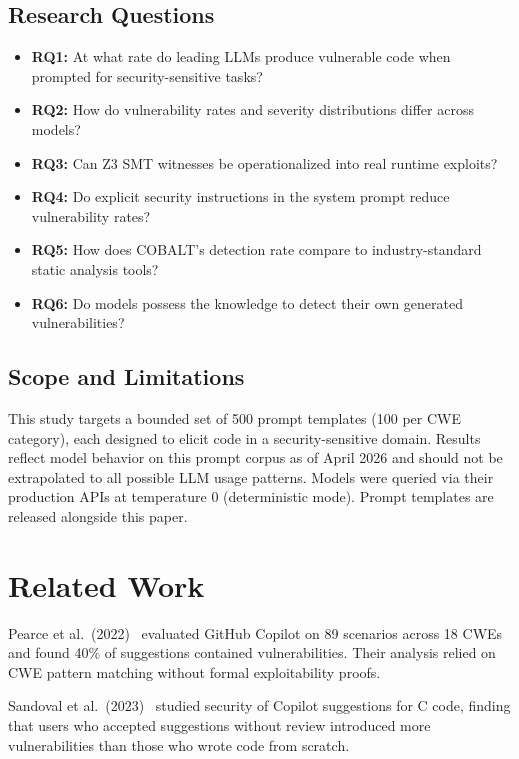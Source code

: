 \documentclass[10pt,twocolumn]{article}
\begin{document}
\subsection{Research Questions}

\begin{itemize}
  \item \textbf{RQ1:} At what rate do leading LLMs produce vulnerable
    code when prompted for security-sensitive tasks?
  \item \textbf{RQ2:} How do vulnerability rates and severity
    distributions differ across models?
  \item \textbf{RQ3:} Can Z3 SMT witnesses be operationalized into real
    runtime exploits?
  \item \textbf{RQ4:} Do explicit security instructions in the system
    prompt reduce vulnerability rates?
  \item \textbf{RQ5:} How does COBALT's detection rate compare to
    industry-standard static analysis tools?
  \item \textbf{RQ6:} Do models possess the knowledge to detect their
    own generated vulnerabilities?
\end{itemize}

\subsection{Scope and Limitations}

This study targets a bounded set of 500 prompt templates (100 per CWE
category), each designed to elicit code in a security-sensitive domain. Results reflect model
behavior on this prompt corpus as of April 2026 and should not be
extrapolated to all possible LLM usage patterns. Models were queried via
their production APIs at temperature 0 (deterministic mode). Prompt
templates are released alongside this paper.

\section{Related Work}

Pearce et al.\ (2022)~\cite{pearce2022} evaluated GitHub Copilot on 89
scenarios across 18 CWEs and found 40\% of suggestions contained
vulnerabilities. Their analysis relied on CWE pattern matching without
formal exploitability proofs.

Sandoval et al.\ (2023)~\cite{sandoval2023} studied security of Copilot
suggestions for C code, finding that users who accepted suggestions
without review introduced more vulnerabilities than those who wrote code
from scratch.
\end{document}

